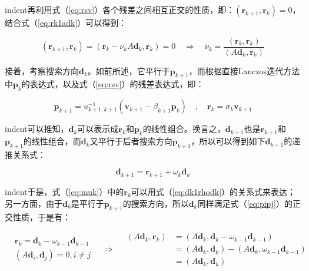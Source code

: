 \documentclass[UTF8,nofonts]{ctexart}
\begin{document}
indent再利用式（\ref{eq:rsv}）各个残差之间相互正交的性质，即：$(\boldsymbol{r}_{k+1},\boldsymbol{r}_k)=0$，结合式（\ref{eq:rk1adk}）可以得到：

\begin{equation}
\label{eq:muk}
(\boldsymbol{r}_{k+1},\boldsymbol{r}_k)=(\boldsymbol{r}_k-\nu_kA\boldsymbol{d}_k,\boldsymbol{r}_k)=0\quad\Longrightarrow\quad
\nu_k=\dfrac{(\boldsymbol{r}_k,\boldsymbol{r}_k)}{(A\boldsymbol{d}_k,\boldsymbol{r}_k)}
\end{equation}

接着，考察搜索方向$\boldsymbol{d}_k$。如前所述，它平行于$\boldsymbol{p}_{k+1}$，而根据直接Lanczos迭代方法中$\boldsymbol{p}_k$的表达式，以及式（\ref{eq:rsv}）的残差表达式，即：

\[
\boldsymbol{p}_{k+1}=u^{-1}_{k+1,k+1}\left(\boldsymbol{v}_{k+1}-\beta_{k+1}\boldsymbol{p}_k\right)\quad,\quad\boldsymbol{r}_k=\sigma_k\boldsymbol{v}_{k+1}
\]

indent可以推知，$\boldsymbol{d}_k$可以表示成$\boldsymbol{r}_k$和$\boldsymbol{p}_k$的线性组合。换言之，$\boldsymbol{d}_{k+1}$也是$\boldsymbol{r}_{k+1}$和$\boldsymbol{p}_{k+1}$的线性组合，而$\boldsymbol{d}_k$又平行于后者搜索方向$\boldsymbol{p}_{k+1}$，所以可以得到如下$\boldsymbol{d}_{k+1}$的递推关系式：

\begin{equation}
\label{eq:dk1rhodk}
\boldsymbol{d}_{k+1}=\boldsymbol{r}_{k+1}+\omega_k\boldsymbol{d}_k
\end{equation}

indent于是，式（\ref{eq:muk}）中的$\boldsymbol{r}_k$可以用式（\ref{eq:dk1rhodk}）的关系式来表达；另一方面，由于$\boldsymbol{d}_k$是平行于$\boldsymbol{p}_{k+1}$的搜索方向，所以$\boldsymbol{d}_k$同样满足式（\ref{eq:pipj}）的正交性质，于是有：

\begin{equation}
\label{eq:adkdk}
\begin{aligned}
&\boldsymbol{r}_{k}=\boldsymbol{d}_k-\omega_{k-1}\boldsymbol{d}_{k-1} \\
&(A\boldsymbol{d}_i,\boldsymbol{d}_j)=0,i\neq j
\end{aligned}\quad\Longrightarrow\quad
\begin{aligned}
(A\boldsymbol{d}_k,\boldsymbol{r}_k) &= (A\boldsymbol{d}_k,\boldsymbol{d}_k-\omega_{k-1}\boldsymbol{d}_{k-1}) \\
&= (A\boldsymbol{d}_k,\boldsymbol{d}_k)-(A\boldsymbol{d}_k,\omega_{k-1}\boldsymbol{d}_{k-1}) \\
&= (A\boldsymbol{d}_k,\boldsymbol{d}_k)
\end{aligned}
\end{equation}
\end{document}
